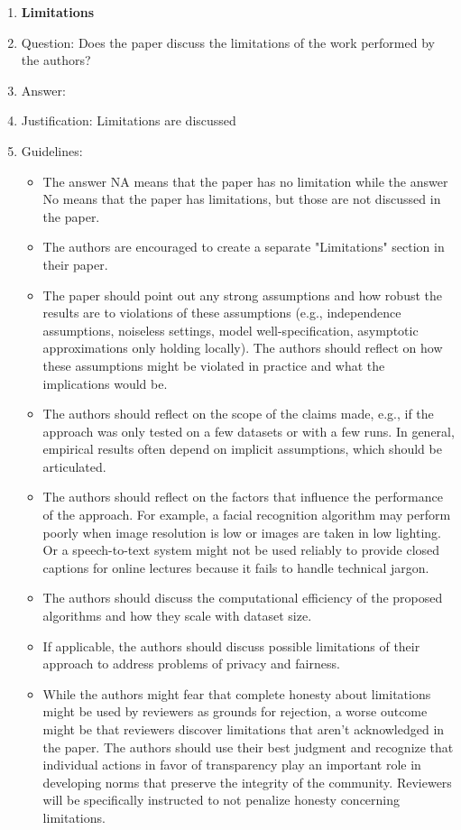 \documentclass{article}
\begin{document}
\begin{enumerate}
\item {\bf Limitations}
    \item[] Question: Does the paper discuss the limitations of the work performed by the authors?
    \item[] Answer: \answerYes{} %
    \item[] Justification: Limitations are discussed 
    \item[] Guidelines:
    \begin{itemize}
        \item The answer NA means that the paper has no limitation while the answer No means that the paper has limitations, but those are not discussed in the paper. 
        \item The authors are encouraged to create a separate "Limitations" section in their paper.
        \item The paper should point out any strong assumptions and how robust the results are to violations of these assumptions (e.g., independence assumptions, noiseless settings, model well-specification, asymptotic approximations only holding locally). The authors should reflect on how these assumptions might be violated in practice and what the implications would be.
        \item The authors should reflect on the scope of the claims made, e.g., if the approach was only tested on a few datasets or with a few runs. In general, empirical results often depend on implicit assumptions, which should be articulated.
        \item The authors should reflect on the factors that influence the performance of the approach. For example, a facial recognition algorithm may perform poorly when image resolution is low or images are taken in low lighting. Or a speech-to-text system might not be used reliably to provide closed captions for online lectures because it fails to handle technical jargon.
        \item The authors should discuss the computational efficiency of the proposed algorithms and how they scale with dataset size.
        \item If applicable, the authors should discuss possible limitations of their approach to address problems of privacy and fairness.
        \item While the authors might fear that complete honesty about limitations might be used by reviewers as grounds for rejection, a worse outcome might be that reviewers discover limitations that aren't acknowledged in the paper. The authors should use their best judgment and recognize that individual actions in favor of transparency play an important role in developing norms that preserve the integrity of the community. Reviewers will be specifically instructed to not penalize honesty concerning limitations.
    \end{itemize}


\end{enumerate}
\end{document}
